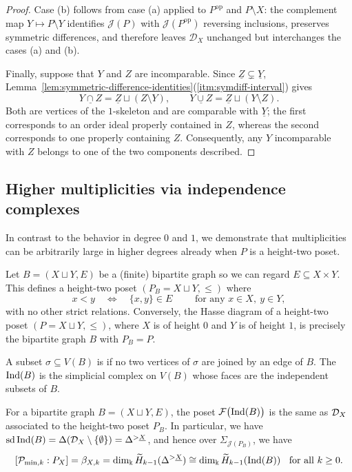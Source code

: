 \documentclass[a4paper,leqno]{amsart}
\begin{document}
\begin{proof}
Case (b) follows from case (a) applied to $P^{\mathrm{op}}$ and $P\setminus X$: the complement map $Y\mapsto P\setminus Y$ identifies $\mathcal J(P)$ with $\mathcal J(P^{\mathrm{op}})$ reversing inclusions, preserves symmetric differences, and therefore leaves $\mathcal D_X$ unchanged but interchanges the cases (a) and (b).

Finally, suppose that $Y$ and $Z$ are incomparable. Since $\underline{Z}\subsetneq\underline{Y}$, Lemma~\ref{lem:symmetric-difference-identities}\textup{(\ref{itm:symdiff-interval})} gives
\[
 \underline{Y\cap Z}=\underline{Z}\sqcup(Z\setminus Y),\qquad
 \underline{Y\cup Z}=\underline{Z}\sqcup(Y\setminus Z).
\]
Both are vertices of the $1$-skeleton and are comparable with $\underline{Y}$; the first corresponds to an order ideal properly contained in $Z$, whereas the second corresponds to one properly containing $Z$.  Consequently, any $Y$ incomparable with $Z$ belongs to one of the two components described.
\end{proof}

\subsection{Higher multiplicities via independence complexes}
\label{subsec:higher-multiplicities}

In contrast to the behavior in degree $0$ and $1$, we demonstrate that multiplicities can be arbitrarily large in higher degrees already when $P$ is a height-two poset.

Let $B=(X\sqcup Y,E)$ be a (finite) bipartite graph so we can regard $E\subseteq X\times Y$.  This defines a height-two poset $(P_B=X\sqcup Y, \le)$ where
\[
 x<y
 \quad\Leftrightarrow\quad
 \{x,y\}\in E
 \qquad \text{ for any } x\in X,\ y\in Y,
\]
with no other strict relations.  Conversely, the Hasse diagram of a height-two poset $(P=X\sqcup Y, \le)$, where $X$ is of height $0$ and $Y$ is of height $1$, is precisely the bipartite graph $B$ with $P_B=P$.

A subset $\sigma\subseteq V(B)$ is  if no two vertices of $\sigma$ are joined by an edge of $B$.  The  $\operatorname{Ind}(B)$ is the simplicial complex on $V(B)$ whose faces are the independent subsets of $B$.

\begin{prop}\label{prop:height-two-independence}
For a bipartite graph $B=(X\sqcup Y,E)$, the poset $\mathcal F\bigl(\operatorname{Ind}(B)\bigr)$ is the same as $\mathcal D_X$ associated to the height-two poset $P_B$. In particular, we have $\operatorname{sd}\operatorname{Ind}(B)=\Delta(\mathcal D_X\setminus\{\emptyset\}) = \Delta^{>\underline{X}}$, and hence over $\Sigma_{\mathcal{J}(P_B)}$, we have
\[
 [\mathcal P_{\min,k}:P_X] = \beta_{X,k} = \dim_{\Bbbk}\widetilde H_{k-1}(\Delta^{>\underline{X}})
 \cong \dim_{\Bbbk}\widetilde H_{k-1}(\operatorname{Ind}(B))
 \;\;\text{ for all } k\ge 0.
\]
\end{prop}
\end{document}
